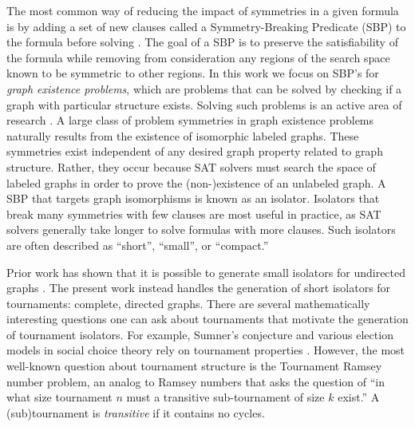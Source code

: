 \documentclass[conference]{IEEEtran}
\begin{document}
The most common way of reducing the impact of symmetries in a given formula is by adding a set of new clauses called a Symmetry-Breaking Predicate (SBP) to the formula before solving \cite{ref_SBP, ref_SBP2, ref_approxmc}. The goal of a SBP is to preserve the satisfiability of the formula while removing from consideration any regions of the search space known to be symmetric to other regions. In this work we focus on SBP's for \emph{graph existence problems}, which are problems that can be solved by checking if a graph with particular structure exists. Solving such problems is an active area of research \cite{ref_vdw, ref_ramseyk, ref_5cycle}. A large class of problem symmetries in graph existence problems naturally results from the existence of isomorphic labeled graphs. These symmetries exist independent of any desired graph property related to graph structure. Rather, they occur because SAT solvers must search the space of labeled graphs in order to prove the (non-)existence of an unlabeled graph. A SBP that targets graph isomorphisms is known as an isolator. Isolators that break many symmetries with few clauses are most useful in practice, as SAT solvers generally take longer to solve formulas with more clauses. Such isolators are often described as ``short'', ``small'', or ``compact.''


Prior work has shown that it is possible to generate small isolators for undirected graphs \cite{ref_heule}. The present work instead handles the generation of short isolators for tournaments: complete, directed graphs. There are several mathematically interesting questions one can ask about tournaments that motivate the generation of tournament isolators. For example, Sumner's conjecture and various election models in social choice theory rely on tournament properties \cite{ref_sumner,ref_social_choice}. However, the most well-known question about tournament structure is the Tournament Ramsey number problem, an analog to Ramsey numbers \cite{ref_ramsey_survey} that asks the question of ``in what size tournament $n$ must a transitive sub-tournament of size $k$ exist.'' A (sub)tournament is \emph{transitive} if it contains no cycles.
\end{document}
